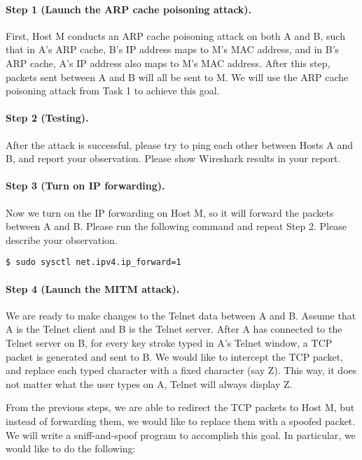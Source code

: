 \paragraph{Step 1 (Launch the ARP cache poisoning attack).} First, Host M conducts an ARP cache
poisoning attack on both A and B, such that in A's ARP cache, B's IP address maps to M's MAC
address, and in B's ARP cache, A's IP address also maps to M's MAC address. After this step,
packets sent between A and B will all be sent to M. We will use the ARP cache poisoning attack
from Task 1 to achieve this goal. 


\paragraph{Step 2 (Testing).} After the attack is successful, please try to ping each other
between Hosts A and B, and report your observation. Please show Wireshark results in your
report.

\paragraph{Step 3 (Turn on IP forwarding).} Now we turn on the IP forwarding on Host M, so it
will forward the packets between A and B. Please run the following command and repeat Step 2.
Please describe your observation. 

\begin{lstlisting}
$ sudo sysctl net.ipv4.ip_forward=1
\end{lstlisting}

\paragraph{Step 4 (Launch the MITM attack).} We are ready to make changes to the Telnet data
between A and B. Assume that A is the Telnet client and B is the Telnet server. After A has
connected to the Telnet server on B, for every key stroke typed in A's Telnet window, a TCP
packet is generated and sent to B. We would like to intercept the TCP packet, and replace each
typed character with a fixed character (say Z). This way, it does not matter what the user
types on A, Telnet will always display Z.

From the previous steps, we are able to redirect the TCP packets to Host M, but instead of
forwarding them, we would like to replace them with a spoofed packet. We will write a
sniff-and-spoof program to accomplish this goal. In particular, we would like to do the
following: 

